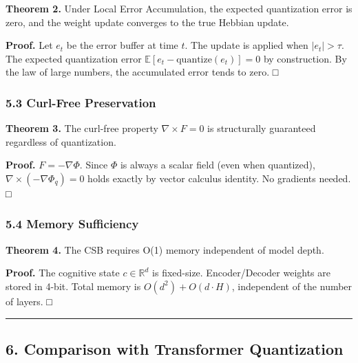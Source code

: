 \documentclass[
  11pt,
  a4paper,
]{article}
\begin{document}
\textbf{Theorem 2.} Under Local Error Accumulation, the expected
quantization error is zero, and the weight update converges to the true
Hebbian update.

\textbf{Proof.} Let \(e_t\) be the error buffer at time \(t\). The
update is applied when \(|e_t| > \tau\). The expected quantization error
\(\mathbb{E}[e_t - \text{quantize}(e_t)] = 0\) by construction. By the
law of large numbers, the accumulated error tends to zero. □

\subsubsection{5.3 Curl-Free Preservation}\label{curl-free-preservation}

\textbf{Theorem 3.} The curl-free property \(\nabla \times F = 0\) is
structurally guaranteed regardless of quantization.

\textbf{Proof.} \(F = -\nabla\Phi\). Since \(\Phi\) is always a scalar
field (even when quantized), \(\nabla \times (-\nabla\Phi_q) = 0\) holds
exactly by vector calculus identity. No gradients needed. □

\subsubsection{5.4 Memory Sufficiency}\label{memory-sufficiency}

\textbf{Theorem 4.} The CSB requires O(1) memory independent of model
depth.

\textbf{Proof.} The cognitive state \(c \in \mathbb{R}^d\) is
fixed-size. Encoder/Decoder weights are stored in 4-bit. Total memory is
\(O(d^2) + O(d \cdot H)\), independent of the number of layers. □

\begin{center}\rule{0.5\linewidth}{0.5pt}\end{center}

\subsection{6. Comparison with Transformer
Quantization}\label{comparison-with-transformer-quantization}
\end{document}
